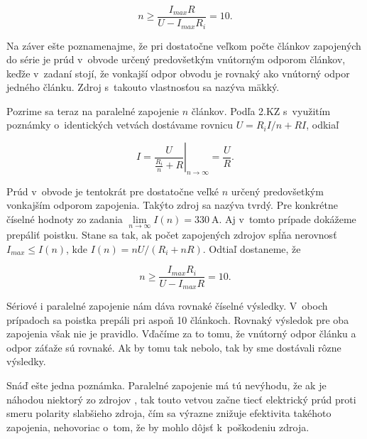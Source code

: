 $$n\geq\frac{I_{max}R}{U-I_{max}R_{i}}=10\text{.}$$

Na záver ešte poznamenajme, že pri dostatočne veľkom počte článkov
zapojených do série je prúd v~obvode určený predovšetkým vnútorným
odporom článkov, keďže v~zadaní stojí, že vonkajší odpor obvodu je
rovnaký ako vnútorný odpor jedného článku. Zdroj s~takouto vlastnosťou
sa nazýva mäkký.



Pozrime sa teraz na paralelné zapojenie $n$ článkov. Podľa 2.KZ
s~využitím poznámky o~identických vetvách dostávame rovnicu $U=R_{i}I/n+RI$,
odkiaľ 

$$I=\left.\frac{U}{\frac{R_{i}}{n}+R}\right|_{n\rightarrow\infty}=\frac{U}{R}\text{.}$$

Prúd v~obvode je tentokrát pre dostatočne veľké $n$ určený predovšetkým
vonkajším odporom zapojenia. Takýto zdroj sa nazýva tvrdý. Pre konkrétne
číselné hodnoty zo zadania $\underset{n\rightarrow\infty}{\lim}I\left(n\right)=\SI{330}{\ampere}$.
Aj v~tomto prípade dokážeme prepáliť poistku. Stane sa tak, ak počet
zapojených zdrojov spĺňa nerovnosť $I_{max}\leq I\left(n\right)$,
kde $I\left(n\right)=nU/(R_{i}+nR)$. Odtiaľ dostaneme, že 

$$n\geq\frac{I_{max}R_{i}}{U-I_{max}R}=10\text{.}$$

Sériové i paralelné zapojenie nám dáva rovnaké číselné výsledky.
V~oboch prípadoch sa poistka prepáli pri aspoň 10 článkoch. Rovnaký
výsledok pre oba zapojenia však nie je pravidlo. Vďačíme za to tomu,
že vnútorný odpor článku a odpor záťaže sú rovnaké. Ak by tomu tak
nebolo, tak by sme dostávali rôzne výsledky.

Snáď ešte jedna poznámka. Paralelné zapojenie má tú nevýhodu, že ak
je náhodou niektorý zo zdrojov , tak touto vetvou začne
tiecť elektrický prúd proti smeru polarity slabšieho zdroja, čím sa
výrazne znižuje efektivita takéhoto zapojenia, nehovoriac o~tom, že
by mohlo dôjsť k~poškodeniu zdroja.



